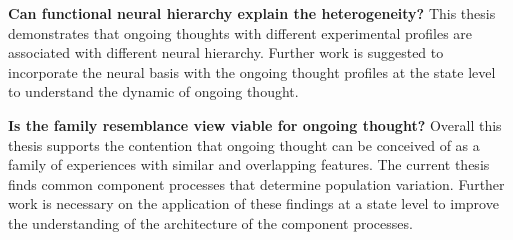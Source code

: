 \textbf{Can functional neural hierarchy explain the heterogeneity?} This thesis demonstrates that ongoing thoughts with different experimental profiles are associated with different neural hierarchy. Further work is suggested to incorporate the neural basis with the ongoing thought profiles at the state level to understand the dynamic of ongoing thought.

\textbf{Is the family resemblance view viable for ongoing thought?} Overall this thesis supports the contention that ongoing thought can be conceived of as a family of experiences with similar and overlapping features. The current thesis finds common component processes that determine population variation. Further work is necessary on the application of these findings at a state level to improve the understanding of the architecture of the component processes.